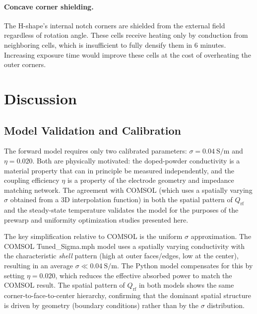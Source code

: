 \documentclass[10pt,twocolumn]{article}
\newcommand{\Qrf}{Q_{\mathrm{rf}}}
\begin{document}
\paragraph{Concave corner shielding.}
The H-shape's internal notch corners are shielded from the external
field regardless of rotation angle.  These cells receive heating only
by conduction from neighboring cells, which is insufficient to fully
densify them in 6 minutes.  Increasing exposure time would improve
these cells at the cost of overheating the outer corners.

\section{Discussion}
\label{sec:discussion}

\subsection{Model Validation and Calibration}

The forward model requires only two calibrated parameters: $\sigma =
\SI{0.04}{\siemens\per\meter}$ and $\eta = 0.020$.  Both are
physically motivated: the doped-powder conductivity is a material
property that can in principle be measured independently, and the
coupling efficiency $\eta$ is a property of the electrode geometry and
impedance matching network.  The agreement with COMSOL (which uses a
spatially varying $\sigma$ obtained from a 3D interpolation function)
in both the spatial pattern of $\Qrf$ and the steady-state temperature
validates the model for the purposes of the prewarp and uniformity
optimization studies presented here.

The key simplification relative to COMSOL is the uniform $\sigma$
approximation.  The COMSOL Tuned\_Sigma.mph model uses a spatially
varying conductivity with the characteristic \emph{shell} pattern
(high at outer faces/edges, low at the center), resulting in an
average $\sigma \ll \SI{0.04}{\siemens\per\meter}$.  The Python model
compensates for this by setting $\eta = 0.020$, which reduces the
effective absorbed power to match the COMSOL result.  The spatial
pattern of $\Qrf$ in both models shows the same corner-to-face-to-center
hierarchy, confirming that the dominant spatial structure is driven by
geometry (boundary conditions) rather than by the $\sigma$ distribution.
\end{document}
